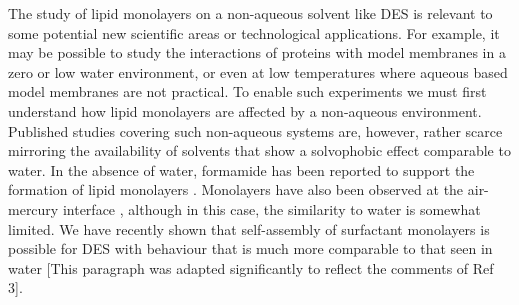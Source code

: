 \documentclass[amsmath,amssymb,twocolumn,superscriptaddress]{revtex4-1}
\begin{document}
The study of lipid monolayers on a non-aqueous solvent like DES is relevant to some potential new scientific areas or technological applications.
For example, it may be possible to study the interactions of proteins with model membranes in a zero or low water environment, or even at low temperatures where aqueous based model membranes are not practical.
To enable such experiments we must first understand how lipid monolayers are affected by a non-aqueous environment.
Published studies covering such non-aqueous systems are, however, rather scarce mirroring the availability of solvents that show a solvophobic effect comparable to water.
In the absence of water, formamide has been reported to support the formation of lipid monolayers \cite{graner_phospholipidic_1995, weinbach_self-assembled_1993}.
Monolayers have also been observed at the air-mercury interface \cite{magnussen_self-assembly_1996, kraack_structure_2002}, although in this case, the similarity to water is somewhat limited.
We have recently shown that self-assembly of surfactant monolayers is possible for DES with behaviour that is much more comparable to that seen in water \cite{arnold_surfactant_2015, sanchez-fernandez_self-assembly_2018} [This paragraph was adapted significantly to reflect the comments of Ref 3].
\end{document}
